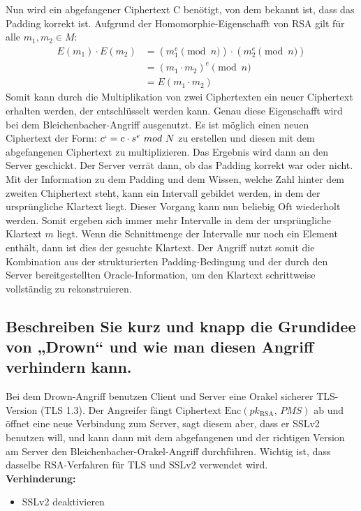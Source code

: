 Nun wird ein abgefangener Ciphertext C benötigt, von dem bekannt ist, dass das Padding korrekt ist. Aufgrund der Homomorphie-Eigenschafft von RSA gilt für alle $m_1, m_2 \in M$:
\[
\begin{aligned}
E(m_1) \cdot E(m_2)
&= (m_1^{e} \pmod{n}) \cdot (m_2^{e} \pmod{n}) \\
&= (m_1 \cdot m_2)^{e} \pmod{n} \\
&= E(m_1 \cdot m_2)
\end{aligned}
\]
Somit kann durch die Multiplikation von zwei Ciphertexten ein neuer Ciphertext erhalten werden, der entschlüsselt werden kann. Genau diese Eigenschafft wird bei dem Bleichenbacher-Angriff ausgenutzt. Es ist möglich einen neuen Ciphertext der Form: $c` = c \cdot s^{e} \ mod\ N$ zu erstellen und diesen mit dem abgefangenen Ciphertext zu multiplizieren. Das Ergebnis wird dann an den Server geschickt. Der Server verrät dann, ob das Padding korrekt war oder nicht. Mit der Information zu dem Padding und dem Wissen, welche Zahl hinter dem zweiten Chiphertext steht, kann ein Intervall gebildet werden, in dem der ursprüngliche Klartext liegt. Dieser Vorgang kann nun beliebig Oft wiederholt werden. Somit ergeben sich immer mehr Intervalle in dem der ursprüngliche Klartext $m$ liegt. Wenn die Schnittmenge der Intervalle nur noch ein Element enthält, dann ist dies der gesuchte Klartext.
Der Angriff nutzt somit die Kombination aus der strukturierten Padding-Bedingung und der durch den Server bereitgestellten Oracle-Information, um den Klartext schrittweise vollständig zu rekonstruieren.

\subsection{Beschreiben Sie kurz und knapp die Grundidee von „Drown“ und wie man diesen Angriff verhindern kann.}
Bei dem Drown-Angriff benutzen Client und Server eine Orakel sicherer TLS-Version (TLS 1.3). Der Angreifer fängt Ciphertext $\mathrm{Enc}(pk_{\mathrm{RSA}},\, PMS)$
ab und öffnet eine neue Verbindung zum Server, sagt diesem aber, dass er SSLv2 benutzen will, und kann dann mit dem abgefangenen und der richtigen Version am Server den Bleichenbacher-Orakel-Angriff durchführen. Wichtig ist, dass dasselbe RSA-Verfahren für TLS und SSLv2 verwendet wird.
\\
\textbf{Verhinderung:} \\
\begin{itemize}
  \item SSLv2 deaktivieren
\end{itemize}

